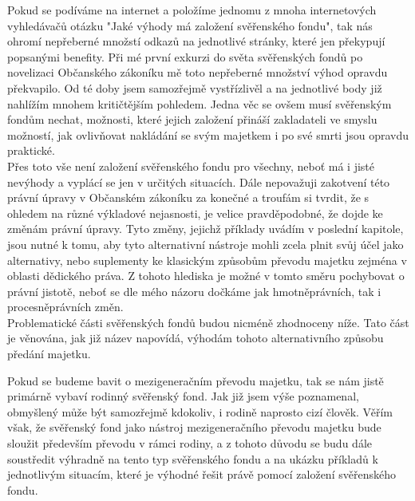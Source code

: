 \documentclass{article}
\begin{document}
Pokud se podíváme na internet a položíme jednomu z mnoha internetových vyhledávačů otázku "Jaké výhody má založení svěřenského fondu", tak nás ohromí nepřeberné množstí odkazů na jednotlivé stránky, které jen překypují popsanými benefity. Při mé první exkurzi do světa svěřenských fondů po novelizaci Občanského zákoníku mě toto nepřeberné množství výhod opravdu překvapilo. Od té doby jsem samozřejmě vystřízlivěl a na jednotlivé body již nahlížím mnohem kritičtějším pohledem. Jedna věc se ovšem musí svěřenským fondům nechat, možnosti, které jejich založení přináší zakladateli ve smyslu možností, jak ovlivňovat nakládání se svým majetkem i po své smrti jsou opravdu praktické.\\

Přes toto vše není založení svěřenského fondu pro všechny, neboť má i jisté nevýhody a vyplácí se jen v určitých situacích. Dále nepovažuji zakotvení této právní úpravy v Občanském zákoníku za konečné a troufám si tvrdit, že s ohledem na různé výkladové nejasnosti, je velice pravděpodobné, že dojde ke změnám právní úpravy. Tyto změny, jejichž příklady uvádím v poslední kapitole, jsou nutné k tomu, aby tyto alternativní nástroje mohli zcela plnit svůj účel jako alternativy, nebo suplementy ke klasickým způsobům převodu majetku zejména v oblasti dědického práva. Z tohoto hlediska je možné v tomto směru pochybovat o právní jistotě, neboť se dle mého názoru dočkáme jak hmotněprávních, tak i procesněprávních změn.\\

 Problematické části svěřenských fondů budou nicméně zhodnoceny níže. Tato část je věnována, jak již název napovídá, výhodám tohoto alternativního způsobu předání majetku. 
 
 Pokud se budeme bavit o mezigeneračním převodu majetku, tak se nám jistě primárně vybaví rodinný svěřenský fond. Jak již jsem výše poznamenal, obmyšlený může být samozřejmě kdokoliv, i rodině naprosto cizí člověk. Věřím však, že svěřenský fond jako nástroj mezigeneračního převodu majetku bude sloužit především převodu v rámci rodiny, a z tohoto důvodu se budu dále soustředit výhradně na tento typ svěřenského fondu a na ukázku příkladů k jednotlivým situacím, které je výhodné řešit právě pomocí založení svěřenského fondu.\\
 
 
\end{document}
